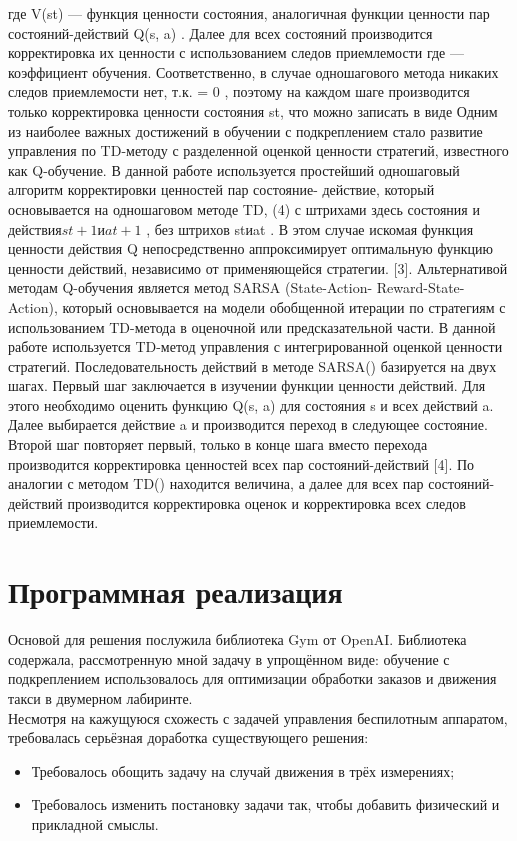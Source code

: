 \documentclass[12pt, a4paper]{report}
\theoremstyle{definition}
\theoremstyle{plain}
\theoremstyle{remark}
\theoremstyle{remark}
\theoremstyle{definition}
\begin{document}
где V(st) — функция ценности состояния, аналогичная функции ценности пар состояний-действий Q(s, a) . Далее для всех состояний производится корректировка их ценности с использованием следов приемлемости где — коэффициент обучения. Соответственно, в случае одношагового метода никаких следов приемлемости нет, т.к.  = 0 , поэтому на каждом шаге производится только корректировка ценности состояния st, что можно записать в виде
Одним из наиболее важных достижений в обучении с подкреплением стало развитие управления по TD-методу с разделенной оценкой ценности стратегий, известного как Q-обучение. В данной работе используется простейший одношаговый алгоритм корректировки ценностей пар состояние- действие, который основывается на одношаговом методе TD, (4) с штрихами здесь состояния и действия$ st+1 иat+1 $ , без штрихов stиat . В этом случае искомая функция ценности действия Q непосредственно аппроксимирует оптимальную функцию ценности действий, независимо от применяющейся стратегии. [3].
Альтернативой методам Q-обучения является метод SARSA (State-Action- Reward-State-Action), который основывается на модели обобщенной итерации по стратегиям с использованием TD-метода в оценочной или предсказательной
части. В данной работе используется TD-метод управления с интегрированной оценкой ценности стратегий. Последовательность действий в методе SARSA() базируется на двух шагах. Первый шаг заключается в изучении функции ценности действий. Для этого необходимо оценить функцию Q(s, a) для состояния s и всех действий a. Далее выбирается действие a и производится переход в следующее состояние. Второй шаг повторяет первый, только в конце
шага вместо перехода производится корректировка ценностей всех пар состояний-действий [4]. По аналогии с методом TD() находится величина, а далее для всех пар состояний-действий производится корректировка оценок и корректировка всех следов приемлемости.

\section{Программная реализация}
Основой для решения послужила библиотека Gym от OpenAI. Библиотека содержала, рассмотренную мной задачу в упрощённом виде: обучение с подкреплением использовалось для оптимизации обработки заказов и движения такси в двумерном лабиринте.\\
Несмотря на кажущуюся схожесть с задачей управления беспилотным аппаратом, требовалась серьёзная доработка существующего решения:
\begin{itemize}
\item Требовалось обощить задачу на случай движения в трёх измерениях;
\item Требовалось изменить постановку задачи так, чтобы добавить физический и прикладной смыслы.
 \end{itemize}
\end{document}
